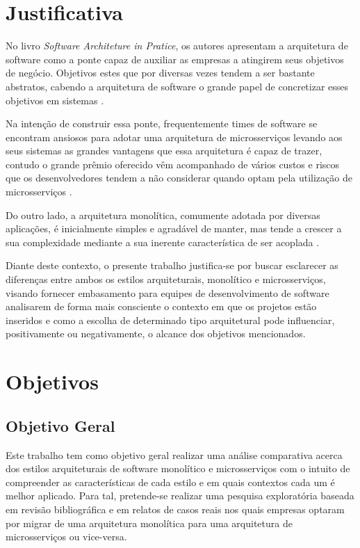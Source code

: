 \section{Justificativa}

No livro \textit{Software Architeture in Pratice}, os autores 
apresentam a arquitetura de software como a ponte capaz de auxiliar as empresas a atingirem seus
objetivos de negócio. Objetivos estes que por diversas vezes tendem a ser bastante abstratos,
cabendo a arquitetura de software o grande papel de concretizar esses objetivos em sistemas
\cite{Bass2015:SoftwareArchitetureInPratice}.

Na intenção de construir essa ponte, frequentemente times de software se encontram ansiosos para
adotar uma arquitetura de microsserviços levando aos seus sistemas as grandes vantagens que essa
arquitetura é capaz de trazer, contudo o grande prêmio oferecido vêm acompanhado de vários custos e
riscos que os desenvolvedores tendem a não considerar quando optam pela utilização de
microsserviços \cite{MartinFowler:MicroservicePremium}.

Do outro lado, a arquitetura monolítica, comumente adotada por diversas aplicações, é inicialmente
simples e agradável de manter, mas tende a crescer a sua complexidade mediante a sua inerente
característica de ser acoplada \cite{StefanTilkov:DontStartWithAMonolith}.

Diante deste contexto, o presente trabalho justifica-se por buscar esclarecer as diferenças entre
ambos os estilos arquiteturais, monolítico e microsserviços, visando fornecer embasamento para equipes
de desenvolvimento de software analisarem de forma mais consciente o contexto em que os projetos
estão inseridos e como a escolha de determinado tipo arquitetural pode influenciar, positivamente ou
negativamente, o alcance dos objetivos mencionados.

\section{Objetivos}

\subsection{Objetivo Geral}
\label{sec:ObjetivoGeral}

Este trabalho tem como objetivo geral realizar uma análise comparativa acerca dos estilos
arquiteturais de software monolítico e microsserviços com o intuito de compreender as
características de cada estilo e em quais contextos cada um é melhor aplicado. Para tal, pretende-se
realizar uma pesquisa exploratória baseada em revisão bibliográfica e em relatos de casos reais nos
quais empresas optaram por migrar de uma arquitetura monolítica para uma arquitetura de
microsserviços ou vice-versa.

